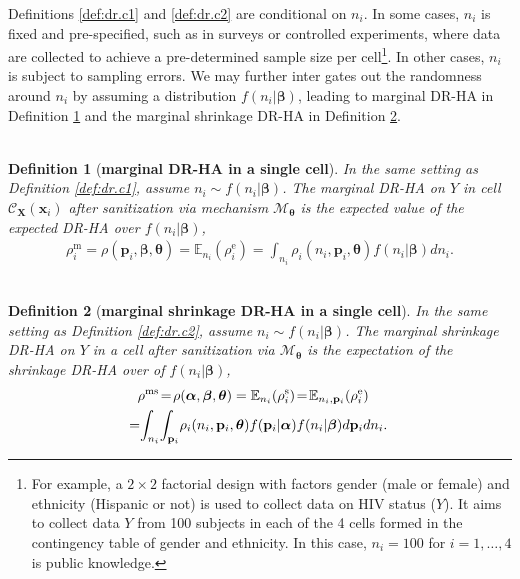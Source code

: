 \documentclass[10pt,journal,compsoc]{IEEEtran}
\newtheorem{defn}{\vspace{-6pt}\\ Definition}
\newcommand{\M}{\mathcal{M}}
\newcommand{\p}{\mathbf{p}}
\newcommand{\X}{\mathbf{X}}
\newcommand{\x}{\mathbf{x}}
\newcommand{\C}{\mathcal{C}}
\newcommand{\bs}{\boldsymbol}
\begin{document}
Definitions \ref{def:dr.c1} and \ref{def:dr.c2}  are conditional on $n_i$. In some cases, $n_i$  is fixed and pre-specified, such as in surveys or controlled experiments, where data are collected to achieve a pre-determined sample size per cell\footnote{For example, a $2\times2$ factorial design with factors gender (male or female) and ethnicity (Hispanic or not) is used to collect data on HIV status ($Y$). It aims to collect data $Y$ from 100 subjects in each of the 4 cells formed in the contingency table of gender and ethnicity. In this case, $n_i=100$ for $i=1,\ldots, 4$ is public knowledge.}. In other cases, $n_i$ is subject to sampling errors. We may further inter gates out the randomness around $n_i$ by assuming  a distribution $f(n_i|\bs\beta)$, leading to  marginal DR-HA in Definition \ref{def:dr.c3} and the marginal shrinkage DR-HA in Definition \ref{def:dr.c4}. 
\begin{defn}[\textbf{marginal DR-HA in a single cell}] \label{def:dr.c3}
In the same setting as Definition \ref{def:dr.c1}, assume $n_i\sim f(n_i|\bs\beta)$. The marginal DR-HA on $Y$ in cell $\C_{\X}(\x_i)$ after sanitization  via mechanism $\M_{\bs\theta}$ is the expected value of the expected DR-HA over $f(n_i|\bs\beta)$,\vspace{-4pt}
\begin{align}\label{eqn:marginal}
\!\!\rho_i^{\text{m}}\!=\!\rho(\p_i,\bs\beta,\bs\theta)
\!=\!\mathbb{E}_{n_i}(\rho^{\text{e}}_i)
\!=\!\!\int_{n_i}\!\!\rho_i(n_i,\p_i,\bs\theta) f(n_i|\bs\beta)dn_i.\!
\end{align}
\end{defn}
\vspace{-4pt} \begin{defn}[\textbf{marginal shrinkage DR-HA in a single cell}] \label{def:dr.c4}
In the same setting as Definition \ref{def:dr.c2}, assume $n_i\sim f(n_i|\bs\beta)$. The marginal shrinkage DR-HA on $Y$ in a cell after sanitization via $\M_{\bs\theta}$ is the expectation of the shrinkage DR-HA over of $f(n_i|\bs\beta)$,\vspace{-4pt}
\begin{align}\label{eqn:marginalshrinkage}
&\rho^{\text{ms}}\!=\!\rho(\bs\alpha,\bs\beta,\bs\theta)=\mathbb{E}_{n_i}(\rho^{\text{s}}_i)
\!=\!\mathbb{E}_{n_i,\p_i}(\rho^{\text{e}}_i)\notag\\
\!=\!&\int_{n_i}\!\int_{\p_i}\!\rho_i(n_i,\p_i,\bs\theta)f(\p_i|\bs\alpha) f(n_i|\bs\beta)d\p_idn_i.
\end{align}
\end{defn}\vspace{-5pt} 
\end{document}
